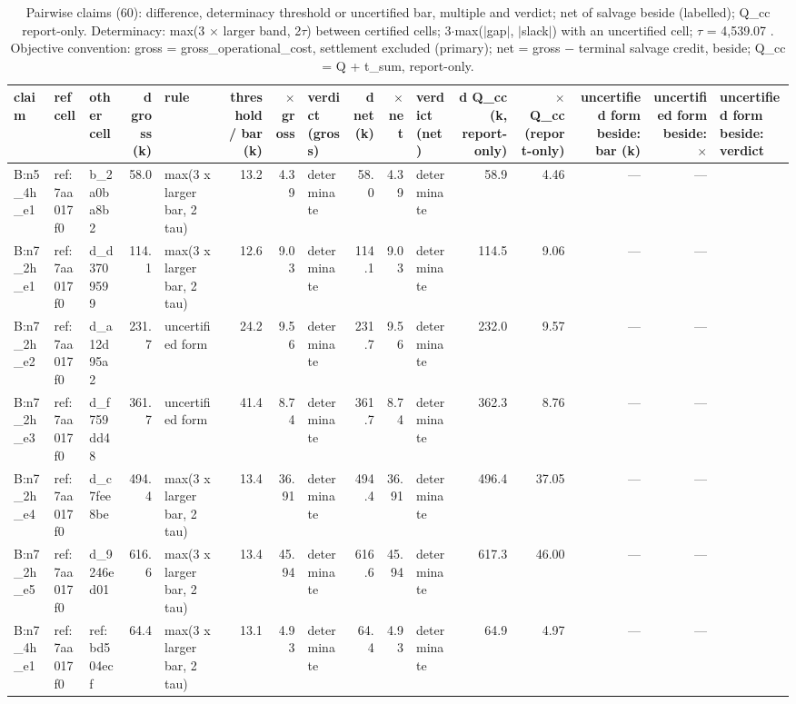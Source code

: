 \begin{table}[htbp]
\centering
\scriptsize
\caption{Pairwise claims (60): difference, determinacy threshold or uncertified bar, multiple and verdict; net of salvage beside (labelled); Q\_cc report-only. Determinacy: max(3 $\times$ larger band, 2$\tau$) between certified cells; 3$\cdot$max($|$gap$|$, $|$slack$|$) with an uncertified cell; $\tau$ = 4,539.07 \texteuro{}. Objective convention: gross = gross\_operational\_cost, settlement excluded (primary); net = gross $-$ terminal salvage credit, beside; Q\_cc = Q + t\_sum, report-only.}
\label{tab:T1}
\begin{tabular}{lllrlrrlrrlrrrrl}
\toprule
claim & ref cell & other cell & d gross (k\texteuro{}) & rule & threshold / bar (k\texteuro{}) & $\times$ gross & verdict (gross) & d net (k\texteuro{}) & $\times$ net & verdict (net) & d Q\_cc (k\texteuro{}, report-only) & $\times$ Q\_cc (report-only) & uncertified form beside: bar (k\texteuro{}) & uncertified form beside: $\times$ & uncertified form beside: verdict \\
\midrule
B:n5\_4h\_e1 & ref:7aa017f0 & b\_2a0ba8b2 & 58.0 & max(3 x larger bar, 2 tau) & 13.2 & 4.39 & determinate & 58.0 & 4.39 & determinate & 58.9 & 4.46 & --- & --- &  \\
B:n7\_2h\_e1 & ref:7aa017f0 & d\_d3709599 & 114.1 & max(3 x larger bar, 2 tau) & 12.6 & 9.03 & determinate & 114.1 & 9.03 & determinate & 114.5 & 9.06 & --- & --- &  \\
B:n7\_2h\_e2 & ref:7aa017f0 & d\_a12d95a2 & 231.7 & uncertified form & 24.2 & 9.56 & determinate & 231.7 & 9.56 & determinate & 232.0 & 9.57 & --- & --- &  \\
B:n7\_2h\_e3 & ref:7aa017f0 & d\_f759dd48 & 361.7 & uncertified form & 41.4 & 8.74 & determinate & 361.7 & 8.74 & determinate & 362.3 & 8.76 & --- & --- &  \\
B:n7\_2h\_e4 & ref:7aa017f0 & d\_c7fee8be & 494.4 & max(3 x larger bar, 2 tau) & 13.4 & 36.91 & determinate & 494.4 & 36.91 & determinate & 496.4 & 37.05 & --- & --- &  \\
B:n7\_2h\_e5 & ref:7aa017f0 & d\_9246ed01 & 616.6 & max(3 x larger bar, 2 tau) & 13.4 & 45.94 & determinate & 616.6 & 45.94 & determinate & 617.3 & 46.00 & --- & --- &  \\
B:n7\_4h\_e1 & ref:7aa017f0 & ref:bd504ecf & 64.4 & max(3 x larger bar, 2 tau) & 13.1 & 4.93 & determinate & 64.4 & 4.93 & determinate & 64.9 & 4.97 & --- & --- &  \\

\end{tabular}
\end{table}
